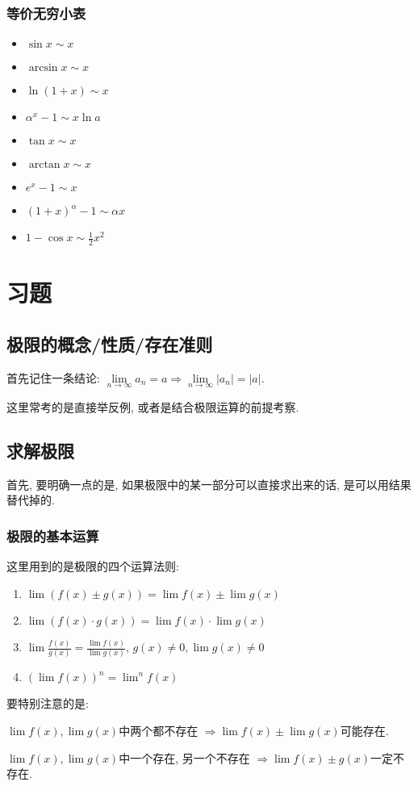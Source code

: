 \subsubsection{等价无穷小表}
\begin{multicols}{2}
\begin{itemize}
\item $ \sin x\sim x $
\item $ \arcsin x\sim x $
\item $ \ln (1+x)\sim x $
\item $ \alpha^{x}-1\sim x\ln a $
\item $ \tan x\sim x $
\item $ \arctan x\sim x $
\item $ e^{x}-1\sim x $
\item $ (1+x)^{\alpha}-1\sim \alpha x $
\item $ 1-\cos x\sim \frac{1}{2}x^{2} $
\end{itemize}
\end{multicols}
\section{习题}
\subsection{极限的概念/性质/存在准则}
首先记住一条结论: $ \lim\limits_{n \rightarrow \infty}a_{n}=a\Rightarrow \lim\limits_{n \rightarrow \infty}|a_{n}|=|a| $.\par
这里常考的是直接举反例, 或者是结合极限运算的前提考察.
\subsection{求解极限}
首先, 要明确一点的是, 如果极限中的某一部分可以直接求出来的话, 是可以用结果替代掉的.
\subsubsection{极限的基本运算}
这里用到的是极限的四个运算法则:
\begin{enumerate}
\item $ \lim\limits (f(x)\pm g(x))=\lim\limits f(x)\pm \lim\limits g(x) $
\item $ \lim\limits (f(x)\cdot g(x))=\lim\limits f(x)\cdot \lim\limits g(x) $
\item $ \lim\limits \frac{f(x)}{g(x)}=\frac{\lim\limits f(x)}{\lim\limits g(x)} $, $ g(x)\neq 0, \lim\limits g(x)\neq 0 $
\item $ (\lim\limits f(x))^{n}={\lim\limits}^{n}f(x) $
\end{enumerate}\par
\begin{tcolorbox}
要特别注意的是:\par
$ \lim\limits f(x), \lim\limits g(x) $中两个都不存在 $ \Rightarrow\lim\limits f(x)\pm \lim\limits g(x) $可能存在.\par
$ \lim\limits f(x), \lim\limits g(x) $中一个存在, 另一个不存在 $ \Rightarrow \lim\limits f(x)\pm g(x) $一定不存在.
\end{tcolorbox}
